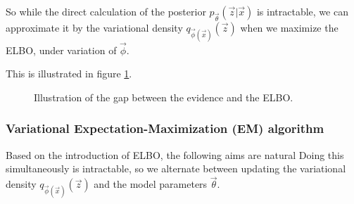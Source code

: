 So while the direct calculation of the posterior $p_{\vec{\theta}}(\vec{z} | \vec{x})$ is intractable, we can
approximate it by the variational density $q_{\vec{\phi}(\vec{x})}(\vec{z})$ when we maximize the ELBO, under
variation of $\vec{\phi}$.

This is illustrated in figure \ref{fig:elbo_gap}.

\begin{figure}[!htb]
    \centering
    
    \caption{Illustration of the gap between the evidence and the ELBO.}
    \label{fig:elbo_gap}
\end{figure}


\subsubsection{Variational Expectation-Maximization (EM) algorithm}
Based on the introduction of ELBO, the following aims are natural
Doing this simultaneously is intractable, so we alternate between updating 
the variational density $q_{\vec{\phi}(\vec{x})}(\vec{z})$ and the model parameters $\vec{\theta}$.

